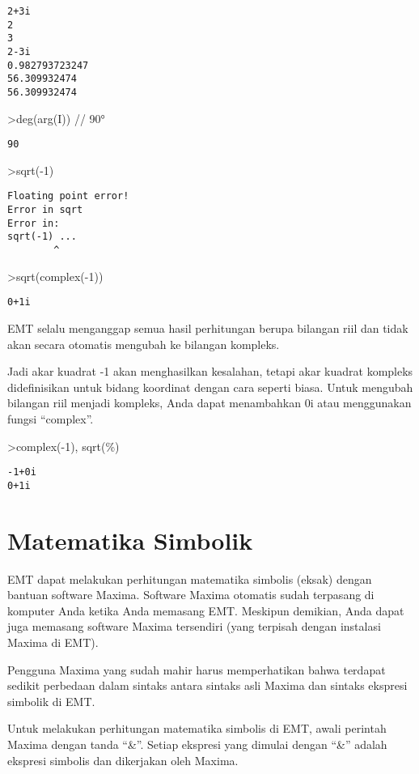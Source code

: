 \documentclass[
]{book}
\begin{document}
\begin{verbatim}
2+3i
2
3
2-3i
0.982793723247
56.309932474
56.309932474
\end{verbatim}

\textgreater deg(arg(I)) // 90°

\begin{verbatim}
90
\end{verbatim}

\textgreater sqrt(-1)

\begin{verbatim}
Floating point error!
Error in sqrt
Error in:
sqrt(-1) ...
        ^
\end{verbatim}

\textgreater sqrt(complex(-1))

\begin{verbatim}
0+1i
\end{verbatim}

EMT selalu menganggap semua hasil perhitungan berupa bilangan riil dan tidak akan secara otomatis mengubah ke bilangan kompleks.

Jadi akar kuadrat -1 akan menghasilkan kesalahan, tetapi akar kuadrat kompleks didefinisikan untuk bidang koordinat dengan cara seperti biasa. Untuk mengubah bilangan riil menjadi kompleks, Anda dapat menambahkan 0i atau menggunakan fungsi ``complex''.

\textgreater complex(-1), sqrt(\%)

\begin{verbatim}
-1+0i 
0+1i
\end{verbatim}

\chapter{Matematika Simbolik}\label{matematika-simbolik}

EMT dapat melakukan perhitungan matematika simbolis (eksak) dengan bantuan software Maxima. Software Maxima otomatis sudah terpasang di komputer Anda ketika Anda memasang EMT. Meskipun demikian, Anda dapat juga memasang software Maxima tersendiri (yang terpisah dengan instalasi Maxima di EMT).

Pengguna Maxima yang sudah mahir harus memperhatikan bahwa terdapat sedikit perbedaan dalam sintaks antara sintaks asli Maxima dan sintaks ekspresi simbolik di EMT.

Untuk melakukan perhitungan matematika simbolis di EMT, awali perintah Maxima dengan tanda ``\&''. Setiap ekspresi yang dimulai dengan ``\&'' adalah ekspresi simbolis dan dikerjakan oleh Maxima.
\end{document}
